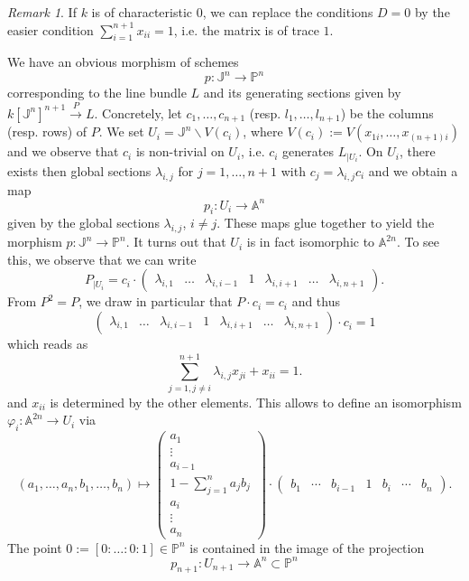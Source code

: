 \documentclass[11pt,leqno]{article}
\newcommand{\A}{{\mathbb A}}
\newcommand{\Proj}{{\mathbb P}}
\newcommand{\Jo}{{\mathbb J}}
\renewcommand{\1}{{\rm 1\hspace*{-0.4ex}%
\rule{0.1ex}{1.52ex}\hspace*{0.2ex}}}
\newcommand{\<}[1]{{\langle}#1 {\rangle}}
\theoremstyle{plain}
\theoremstyle{definition}
\theoremstyle{remark}
\newtheorem{rem}[thm]{Remark}
\numberwithin{equation}{section}
\begin{document}
\begin{rem}
If $k$ is of characteristic $0$, we can replace the conditions $D=0$ by the easier condition $\sum_{i=1}^{n+1}x_{ii}=1$, i.e. the matrix is of trace $1$.  
\end{rem}

We have an obvious morphism of schemes 
\[
p:\mathbb{J}^n\to \Proj^n
\]
corresponding to the line bundle $L$ and its generating sections given by $k[\mathbb{J}^n]^{n+1}\xrightarrow{P} L$. Concretely, let $c_1,\ldots,c_{n+1}$ (resp. $l_1,\ldots,l_{n+1}$) be the columns (resp. rows) of $P$. We set $U_i=\Jo^n\smallsetminus V(c_i)$, where $V(c_i):=V(x_{1i},\ldots,x_{(n+1)i})$ and we observe that $c_i$ is non-trivial on $U_i$, i.e. $c_i$ generates $L_{\vert U_i}$. On $U_i$, there exists then global sections $\lambda_{i,j}$ for $j=1,\ldots,n+1$ with $c_j=\lambda_{i,j}c_i$ and we obtain a map
\[
p_i:U_i\to \A^n
\]
given by the global sections $\lambda_{i,j}$, $i\neq j$. These maps glue together to yield the morphism $p:\mathbb{J}^n\to \Proj^n$. It turns out that $U_i$ is in fact isomorphic to $\A^{2n}$. To see this, we observe that we can write 
\[
P_{\vert U_i}=c_i\cdot \begin{pmatrix} \lambda_{i,1} & \ldots & \lambda_{i,i-1} & 1 & \lambda_{i,i+1} & \ldots & \lambda_{i,n+1}\end{pmatrix}.
\]
From $P^2=P$, we draw in particular that $P\cdot c_i=c_i$ and thus 
\[
\begin{pmatrix} \lambda_{i,1} & \ldots & \lambda_{i,i-1} & 1 & \lambda_{i,i+1} & \ldots & \lambda_{i,n+1}\end{pmatrix}\cdot c_i=1
\]
which reads as 
\[
\sum_{j=1, j\neq i}^{n+1}\lambda_{i,j}x_{ji}+x_{ii}=1.
\]
and $x_{ii}$ is determined by the other elements. This allows to define an isomorphism $\varphi_i:\A^{2n}\to U_i$ via
\[
(a_1,\ldots,a_n,b_1,\ldots,b_n)\mapsto \begin{pmatrix} a_1 \\ \vdots \\ a_{i-1} \\ 1-\sum_{j=1}^na_jb_j \\ a_i \\ \vdots \\ a_n\end{pmatrix}\cdot 
\begin{pmatrix} b_1 & \cdots & b_{i-1} & 1 & b_i & \cdots & b_n\end{pmatrix}.
\]
The point $0:=[0:\ldots:0:1]\in \mathbb{P}^n$ is contained in the image of the projection 
\[
p_{n+1}\colon U_{n+1}\to \A^n\subset \mathbb{P}^n
\]
\end{document}

